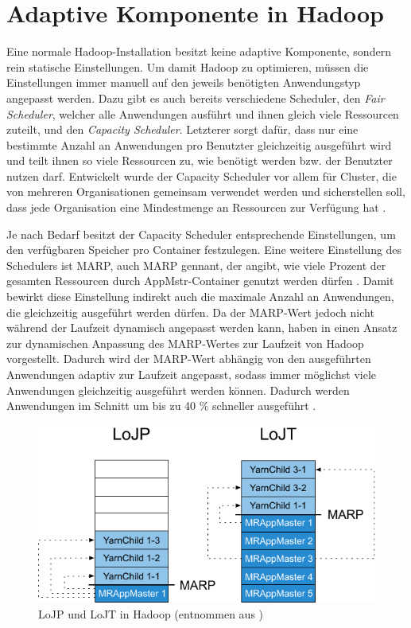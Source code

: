 \section{Adaptive Komponente in Hadoop}\label{sec:inriaSetting}

Eine normale Hadoop-Installation besitzt keine adaptive Komponente, sondern rein statische Einstellungen. Um damit Hadoop zu optimieren, müssen die Einstellungen immer manuell auf den jeweils benötigten Anwendungstyp angepasst werden. Dazu gibt es auch bereits verschiedene Scheduler, den \emph{Fair Scheduler}, welcher alle Anwendungen ausführt und ihnen gleich viele Ressourcen zuteilt, und den \emph{Capacity Scheduler}. Letzterer sorgt dafür, dass nur eine bestimmte Anzahl an Anwendungen pro Benutzter gleichzeitig ausgeführt wird und teilt ihnen so viele Ressourcen zu, wie benötigt werden bzw. der Benutzter nutzen darf. Entwickelt wurde der Capacity Scheduler vor allem für Cluster, die von mehreren Organisationen gemeinsam verwendet werden und sicherstellen soll, dass jede Organisation eine Mindestmenge an Ressourcen zur Verfügung hat \cite{HadoopCapScheduler271}.

Je nach Bedarf besitzt der Capacity Scheduler entsprechende Einstellungen, um \zB den verfügbaren Speicher pro Container festzulegen. Eine weitere Einstellung des Schedulers ist \acl{MARP}, auch \acs{MARP} gennant, der angibt, wie viele Prozent der gesamten Ressourcen durch \ac{AppMstr}-Container genutzt werden dürfen \cite{HadoopCapScheduler271}. Damit bewirkt diese Einstellung indirekt auch die maximale Anzahl an Anwendungen, die gleichzeitig ausgeführt werden dürfen. Da der \ac{MARP}-Wert jedoch nicht während der Laufzeit dynamisch angepasst werden kann, haben \citeauthor{zhang2016} in \cite{zhang2016} einen Ansatz zur dynamischen Anpassung des \ac{MARP}-Wertes zur Laufzeit von Hadoop vorgestellt. Dadurch wird der \ac{MARP}-Wert abhängig von den ausgeführten Anwendungen adaptiv zur Laufzeit angepasst, sodass immer möglichst viele Anwendungen gleichzeitig ausgeführt werden können. Dadurch werden Anwendungen im Schnitt um bis zu 40 \% schneller ausgeführt \cite{zhang2016}.

\begin{figure}
    \includegraphics{./images/marpValue.pdf}
    \caption[LoJP und LoJT in Hadoop]{LoJP und LoJT in Hadoop (entnommen aus \cite{zhang2016})}
    \label{fig:marpValue}
\end{figure}

